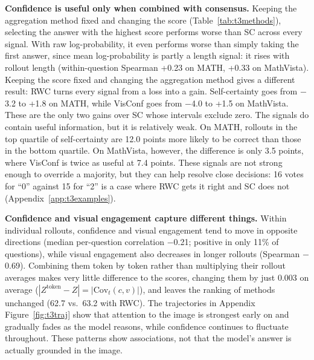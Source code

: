\documentclass{article}
\begin{document}
\textbf{Confidence is useful only when combined with consensus.} Keeping the aggregation method fixed and changing the score (Table~\ref{tab:t3methods}), selecting the answer with the highest score performs worse than SC across every signal. With raw log-probability, it even performs worse than simply taking the first answer, since mean log-probability is partly a length signal: it rises with rollout length (within-question Spearman +0.23 on MATH, +0.33 on MathVista). Keeping the score fixed and changing the aggregation method gives a different result: RWC turns every signal from a loss into a gain. Self-certainty goes from $-$3.2 to +1.8 on MATH, while VisConf goes from $-$4.0 to +1.5 on MathVista. These are the only two gains over SC whose intervals exclude zero. The signals do contain useful information, but it is relatively weak. On MATH, rollouts in the top quartile of self-certainty are 12.0 points more likely to be correct than those in the bottom quartile. On MathVista, however, the difference is only 3.5 points, where VisConf is twice as useful at 7.4 points. These signals are not strong enough to override a majority, but they can help resolve close decisions: 16 votes for ``0'' against 15 for ``2'' is a case where RWC gets it right and SC does not (Appendix~\ref{app:t3examples}).

\textbf{Confidence and visual engagement capture different things.} Within individual rollouts, confidence and visual engagement tend to move in opposite directions (median per-question correlation $-$0.21; positive in only 11\% of questions), while visual engagement also decreases in longer rollouts (Spearman $-$0.69). Combining them token by token rather than multiplying their rollout averages makes very little difference to the scores, changing them by just 0.003 on average ($|Z^{\text{token}}-Z|=|\mathrm{Cov}_t(c,v)|$), and leaves the ranking of methods unchanged (62.7 vs.\ 63.2 with RWC). The trajectories in Appendix Figure~\ref{fig:t3traj} show that attention to the image is strongest early on and gradually fades as the model reasons, while confidence continues to fluctuate throughout. These patterns show associations, not that the model's answer is actually grounded in the image.
\end{document}
